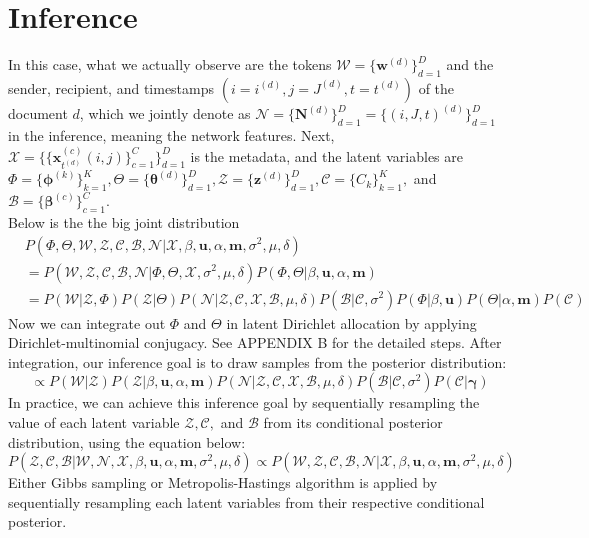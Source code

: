 \documentclass[a4paper]{article}
\begin{document}
   \section{Inference} \label{sec: Inference}
In this case, what we actually observe are the tokens $\mathcal{W}=\{\boldsymbol{w}^{(d)} \}_{d=1}^{D}$ and the sender, recipient, and timestamps $(i=i^{(d)}, j=J^{(d)}, t=t^{(d)})$ of the document $d$, which we jointly denote as $\mathcal{N} = \{\boldsymbol{N}^{(d)}\}_{d=1}^D=\{(i, J, t)^{(d)}\}_{d=1}^D$ in the inference, meaning the network features. Next,  $\mathcal{X}=\{\{\boldsymbol{x}^{(c)}_{t^{(d)}}(i, j)\}_{c=1}^C\}_{d=1}^{D}$ is the metadata, and the latent variables are $\Phi=\{\boldsymbol{\phi}^{(k)}\}_{k=1}^{K}, \Theta=\{\boldsymbol{\theta}^{(d)} \}_{d=1}^{D}, \mathcal{Z}=\{\boldsymbol{z}^{(d)} \}_{d=1}^{D}, \mathcal{C}=\{{C}_k \}_{k=1}^{K},$ and $\mathcal{B}=\{\boldsymbol{\beta}^{(c)} \}_{c=1}^{C}$.\\
 \newline 
 Below is the the big joint distribution
 \begin{equation}
 \begin{aligned}
 & P(\Phi, \Theta, \mathcal{W}, \mathcal{Z}, \mathcal{C}, \mathcal{B}, \mathcal{N}| \mathcal{X}, \beta, \boldsymbol{u}, \alpha, \boldsymbol{m}, \sigma^2, \mu, \delta) \\& 
 =  P(\mathcal{W}, \mathcal{Z}, \mathcal{C}, \mathcal{B}, \mathcal{N}| \Phi, \Theta, \mathcal{X}, \sigma^2, \mu, \delta) P(\Phi, \Theta |\beta, \boldsymbol{u}, \alpha, \boldsymbol{m})
 \\&= P( \mathcal{W}| \mathcal{Z}, \Phi)P(\mathcal{Z}|\Theta)P(\mathcal{N}|\mathcal{Z}, \mathcal{C}, \mathcal{X}, \mathcal{B}, \mu, \delta)P(\mathcal{B}|\mathcal{C}, \sigma^2)P(\Phi|\beta, \boldsymbol{u})P(\Theta|\alpha, \boldsymbol{m})P(\mathcal{C})
 \end{aligned}
 \end{equation}
 Now we can integrate out $\Phi$ and $\Theta$ in latent Dirichlet allocation by applying Dirichlet-multinomial conjugacy. See APPENDIX B for the detailed steps. After integration, our inference goal is to draw samples from the posterior distribution:
 \begin{equation}
 \propto P(\mathcal{W}|\mathcal{Z})P( \mathcal{Z}|\beta, \boldsymbol{u}, \alpha, \boldsymbol{m})P(\mathcal{N}|\mathcal{Z}, \mathcal{C}, \mathcal{X}, \mathcal{B},\mu, \delta)P(\mathcal{B}|\mathcal{C}, \sigma^2)P(\mathcal{C}|\boldsymbol{\gamma})
 \end{equation}
In practice, we can achieve this inference goal by sequentially resampling the value of each latent variable $\mathcal{Z}, \mathcal{C},$ and $\mathcal{B}$ from its conditional posterior distribution, using the equation below:
 \begin{equation}
 P( \mathcal{Z}, \mathcal{C}, \mathcal{B}|\mathcal{W}, \mathcal{N}, \mathcal{X}, \beta, \boldsymbol{u}, \alpha, \boldsymbol{m}, \sigma^2, \mu, \delta) \propto P(\mathcal{W},  \mathcal{Z}, \mathcal{C}, \mathcal{B}, \mathcal{N} | \mathcal{X}, \beta, \boldsymbol{u}, \alpha, \boldsymbol{m}, \sigma^2, \mu, \delta)
 \end{equation}
 Either Gibbs sampling or Metropolis-Hastings algorithm is applied by sequentially resampling each latent variables from their respective conditional posterior.
\end{document}
